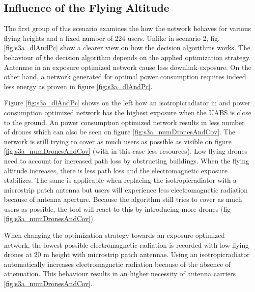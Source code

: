 \subsection{Influence of the Flying Altitude}
\label{S3A}

The first group of this scenario examines the how the network behaves for various flying heights and a fixed number of 224 users.
Unlike in scenario 2, fig. \ref{fig:s3a_dlAndPc} show a clearer view on how the decision algorithms
works. 
The behaviour of the decision algorithm depends on the applied optimization strategy. 
Antennae in an exposure optimized network cause less downlink exposure. On the other hand, 
a network generated for optimal power consumption requires indeed less energy as proven in figure \ref{fig:s3a_dlAndPc}. 

Figure \ref{fig:s3a_dlAndPc} shows on the left how an \gls{isotropicradiator} in and power consumption optimized network has the highest exposure when 
the \gls{UABS}  is close to the ground. An power consumption optimized network results in less number of drones which can also be seen 
on figure \ref{fig:s3a_numDronesAndCov}. The network is still trying to cover as much users as possible as visible on figure 
\ref{fig:s3a_numDronesAndCov} (with in this case less resources). Low flying drones need to account for increased path loss by obstructing buildings.
When the flying altitude increases, there is less path loss and the electromagnetic exposure stabilizes. The same is applicable when replacing
the \gls{isotropicradiator} with a microstrip patch antenna but users will experience less electromagnetic radiation 
because of antenna aperture. Because the algorithm still tries to cover as much users as possible, the tool will react to this by 
introducing more drones (fig \ref{fig:s3a_numDronesAndCov}).

When changing the optimization strategy towards an exposure optimized network, the lowest possible electromagnetic radiation is recorded
with low flying drones at 20 m height with microstrip patch antennae. Using an \gls{isotropicradiator} automatically increases electromagnetic 
radiation because of the absence of attenuation. This behaviour results in an higher necessity of antenna carriers \ref{fig:s3a_numDronesAndCov}.

